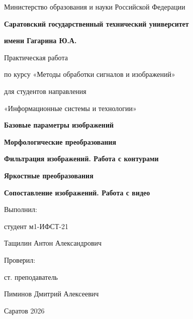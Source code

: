 \documentclass[12pt,a4paper]{article}
\begin{document}
\begin{titlepage}
\centering

{\large Министерство образования и науки Российской Федерации\par}

\vspace{1cm}

{\large\textbf{Саратовский государственный технический университет}\par}
{\large\textbf{имени Гагарина Ю.А.}\par}

\vspace{2cm}

{\large Практическая работа\par}

\vspace{0.3cm}

{\large по курсу «Методы обработки сигналов и изображений»\par}

\vspace{0.3cm}

{\large для студентов направления\par}
{\large «Информационные системы и технологии»\par}

\vspace{2cm}

{\large\textbf{Базовые параметры изображений}\par}
\vspace{0.2cm}
{\large\textbf{Морфологические преобразования}\par}
\vspace{0.2cm}
{\large\textbf{Фильтрация изображений. Работа с контурами}\par}
\vspace{0.2cm}
{\large\textbf{Яркостные преобразования}\par}
\vspace{0.2cm}
{\large\textbf{Сопоставление изображений. Работа с видео}\par}

\vfill

\begin{flushright}
\begin{minipage}{0.45\textwidth}
\raggedright
Выполнил:\par
студент м1-ИФСТ-21\par
Тащилин Антон Александрович\par

\vspace{0.5cm}

Проверил:\par
ст. преподаватель\par
Пиминов Дмитрий Алексеевич\par
\end{minipage}
\end{flushright}

\vfill

{\large Саратов 2026\par}

\end{titlepage}
\end{document}
